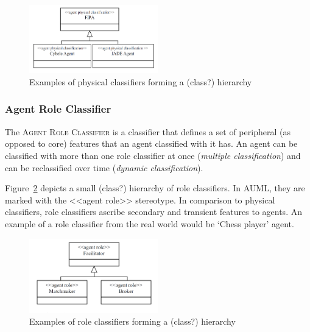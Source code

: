 \begin{figure}[h]
	\centering
	\includegraphics[width=0.5\textwidth]{images/onp-physical-classifier-examples.png}
	\caption{Examples of physical classifiers forming a (class?) hierarchy}
	\label{figure:onp-physical-classifier-examples}
\end{figure}

\subsubsection*{Agent Role Classifier}

The \textsc{Agent Role Classifier} is a classifier that defines a set of peripheral (as opposed to core) features that an agent classified with it has.
An agent can be classified with more than one role classifier at once (\textit{multiple classification}) and can be reclassified over time (\textit{dynamic classification}).

Figure~\ref{figure:onp-role-classifier-examples} depicts a small (class?) hierarchy of role classifiers.
In AUML, they are marked with the <<agent role>> stereotype.
In comparison to physical classifiers, role classifiers ascribe secondary and transient features to agents.
An example of a role classifier from the real world would be `Chess player' agent.

\begin{figure}[h]
	\centering
	\includegraphics[width=0.5\textwidth]{images/onp-role-classifier-examples.png}
	\caption{Examples of role classifiers forming a (class?) hierarchy}
	\label{figure:onp-role-classifier-examples}
\end{figure}

